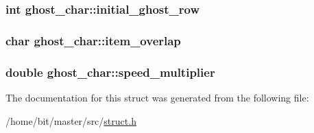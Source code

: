 \hypertarget{structghost__char_a734ad05eb363be665d643e4ad2c5d260}{
\subsubsection[{initial\-\_\-ghost\-\_\-row}]{\setlength{\rightskip}{0pt plus 5cm}int ghost\-\_\-char\-::initial\-\_\-ghost\-\_\-row}}\label{structghost__char_a734ad05eb363be665d643e4ad2c5d260}
\hypertarget{structghost__char_adda1e7c697556e2fb2a221a0a979af1a}{
\subsubsection[{item\-\_\-overlap}]{\setlength{\rightskip}{0pt plus 5cm}char ghost\-\_\-char\-::item\-\_\-overlap}}\label{structghost__char_adda1e7c697556e2fb2a221a0a979af1a}
\hypertarget{structghost__char_a6029da7c0e90ee9fdd44e8387df962a3}{
\subsubsection[{speed\-\_\-multiplier}]{\setlength{\rightskip}{0pt plus 5cm}double ghost\-\_\-char\-::speed\-\_\-multiplier}}\label{structghost__char_a6029da7c0e90ee9fdd44e8387df962a3}


The documentation for this struct was generated from the following file\-:\begin{DoxyCompactItemize}
\item 
/home/bit/master/src/\hyperlink{struct_8h}{struct.\-h}\end{DoxyCompactItemize}
